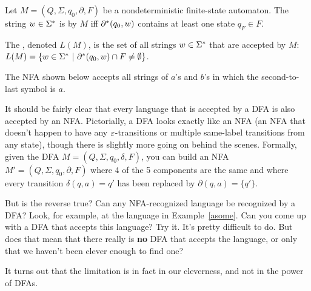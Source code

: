 \smallskip

\begin{definition}
Let $M= (Q, \Sigma, q_0, \partial, F)$ be a nondeterministic finite-state
automaton.  The string $w \in \Sigma^*$ is  
by $M$ iff $\partial^*(q_0,w)$ contains at least one state $q_F \in F$.

The , denoted $L(M)$, is the set of all strings 
$w \in \Sigma^*$ that are
accepted by $M$: $L(M) = \{ w \in \Sigma^* \ | \ \partial^*(q_0, w) \cap F \not= 
\emptyset\}$.
\end{definition}

\smallskip


\begin{example}\label{asome} The NFA shown below accepts all strings of $a$'s 
and $b$'s in which the second-to-last symbol is $a$.


\end{example} 

It should be fairly clear that every language that is accepted by a DFA is also
accepted by an NFA.  Pictorially, a DFA looks exactly like an NFA (an NFA that
doesn't happen to have any $\varepsilon$-transitions or multiple same-label
transitions from any state), though there is slightly more going on behind
the scenes.  Formally, given the DFA $M=(Q, \Sigma, q_0, \delta, F)$, you can
build an NFA $M'=(Q, \Sigma, q_0, \partial, F)$ where 4 of the 5 components
are the same and where every transition $\delta(q,a) = q'$ has been replaced by
$\partial(q,a) = \{q'\}$. 

But is the reverse true?  Can any NFA-recognized language be recognized by a DFA?
Look, for example, at the language in Example~\ref{asome}.  Can you come up with
a DFA that accepts this language?  Try it.  It's pretty difficult to do.  But
does that mean that there really is {\bf no} DFA that accepts the language, or
only that we haven't been clever enough to find one?

It turns out that the limitation is in fact in our cleverness, and not in the
power of DFAs.

